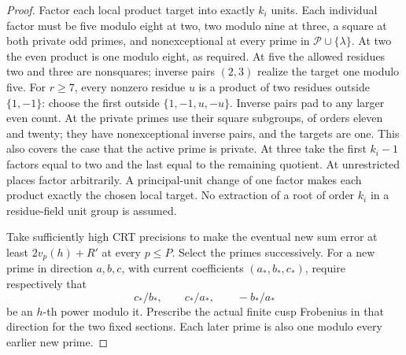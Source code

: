 \begin{proof}
Factor each local product target into exactly \(k_i\) units.
Each individual factor must be five modulo eight at two, two
modulo nine at three, a square at both private odd primes,
and nonexceptional at every prime in
\(\mathcal P\cup\{\lambda\}\).
At two the even product is one modulo eight, as required.
At five the allowed residues two and three are nonsquares;
inverse pairs \((2,3)\) realize the target one modulo five.
For \(r\ge7\), every nonzero residue \(u\) is a product
of two residues outside \(\{1,-1\}\): choose the first
outside \(\{1,-1,u,-u\}\). Inverse pairs pad to any larger
even count. At the private primes use their square subgroups,
of orders eleven and twenty; they have nonexceptional inverse
pairs, and the targets are one. This also covers the case that
the active prime is private. At three take the first
\(k_i-1\) factors equal to two and the last equal to the
remaining quotient. At unrestricted places factor arbitrarily.
A principal-unit change of one factor makes each product exactly
the chosen local target. No extraction of a root of order
\(k_i\) in a residue-field unit group is assumed.

Take sufficiently high CRT precisions to make the eventual new
sum error at least \(2v_p(h)+R'\) at every \(p\le P\).
Select the primes successively. For a new prime in direction
\(a,b,c\), with current coefficients \((a_*,b_*,c_*)\),
require respectively that
\[
               c_*/b_*,\qquad c_*/a_*,\qquad -b_*/a_*
 \tag{E.172.7}
\]
be an \(h\)-th power modulo it. Prescribe the actual finite
cusp Frobenius in that direction for the two fixed sections.
Each later prime is also one modulo every earlier new prime.


\end{proof}
